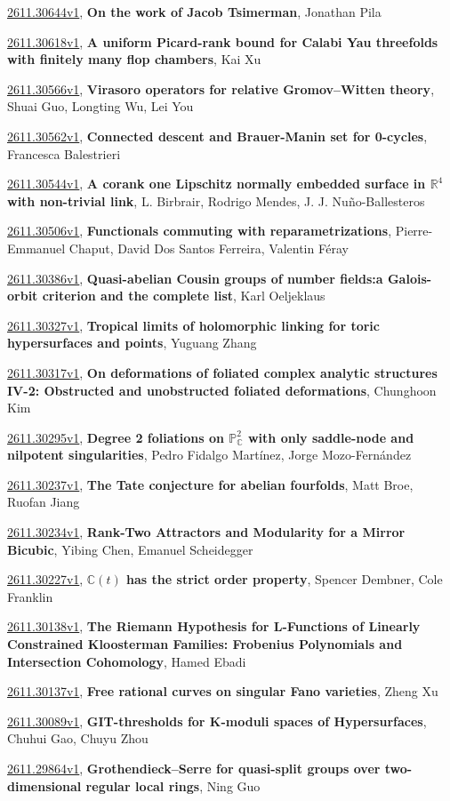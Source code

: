 \documentclass[9pt, a4paper]{article}
\theoremstyle{plain}
\theoremstyle{definition}
\theoremstyle{remark}
\newcommand{\arxiv}[3]{\href{https://arxiv.org/abs/#1}{#1}, \textbf{\textcolor{arxivblue}{#2}}, #3}
\begin{document}
\arxiv{2611.30644v1}{On the work of Jacob Tsimerman}{Jonathan Pila}

\arxiv{2611.30618v1}{A uniform Picard-rank bound for Calabi Yau threefolds with finitely many flop chambers}{Kai Xu}

\arxiv{2611.30566v1}{Virasoro operators for relative Gromov--Witten theory}{Shuai Guo, Longting Wu, Lei You}

\arxiv{2611.30562v1}{Connected descent and Brauer-Manin set for 0-cycles}{Francesca Balestrieri}

\arxiv{2611.30544v1}{A corank one Lipschitz normally embedded surface in $\mathbb{R}^4$ with non-trivial link}{L. Birbrair, Rodrigo Mendes, J. J. Nuño-Ballesteros}

\arxiv{2611.30506v1}{Functionals commuting with reparametrizations}{Pierre-Emmanuel Chaput, David Dos Santos Ferreira, Valentin Féray}

\arxiv{2611.30386v1}{Quasi-abelian Cousin groups of number fields:a Galois-orbit criterion and the complete list}{Karl Oeljeklaus}

\arxiv{2611.30327v1}{Tropical limits of holomorphic linking for toric hypersurfaces and points}{Yuguang Zhang}

\arxiv{2611.30317v1}{On deformations of foliated complex analytic structures IV-2: Obstructed and unobstructed foliated deformations}{Chunghoon Kim}

\arxiv{2611.30295v1}{Degree 2 foliations on $\mathbb{P}^2_{\mathbb{C}}$ with only saddle-node and nilpotent singularities}{Pedro Fidalgo Martínez, Jorge Mozo-Fernández}

\arxiv{2611.30237v1}{The Tate conjecture for abelian fourfolds}{Matt Broe, Ruofan Jiang}

\arxiv{2611.30234v1}{Rank-Two Attractors and Modularity for a Mirror Bicubic}{Yibing Chen, Emanuel Scheidegger}

\arxiv{2611.30227v1}{$\mathbb{C}(t)$ has the strict order property}{Spencer Dembner, Cole Franklin}

\arxiv{2611.30138v1}{The Riemann Hypothesis for L-Functions of Linearly Constrained Kloosterman Families: Frobenius Polynomials and Intersection Cohomology}{Hamed Ebadi}

\arxiv{2611.30137v1}{Free rational curves on singular Fano varieties}{Zheng Xu}

\arxiv{2611.30089v1}{GIT-thresholds for K-moduli spaces of Hypersurfaces}{Chuhui Gao, Chuyu Zhou}

\arxiv{2611.29864v1}{Grothendieck--Serre for quasi-split groups over two-dimensional regular local rings}{Ning Guo}
\end{document}
